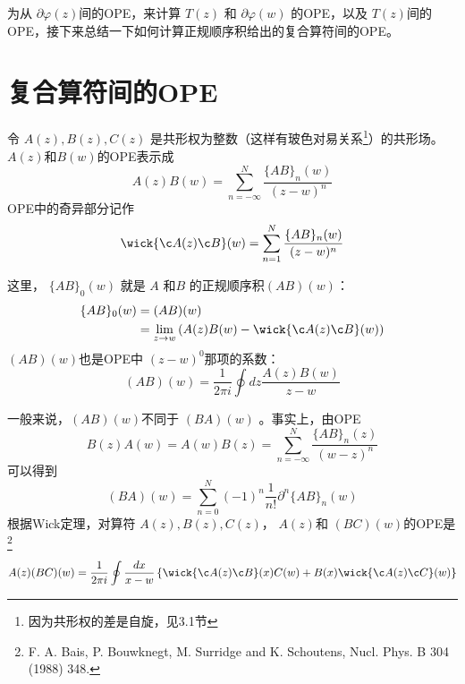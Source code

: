为从 $\partial \varphi(z) $间的OPE，来计算 $T(z)$ 和 $\partial \varphi(w)$ 的OPE，以及 $T(z) $间的OPE，接下来总结一下如何计算正规顺序积给出的复合算符间的OPE。

\section{复合算符间的OPE}
令 $A(z),B(z),C(z)$ 是共形权为整数（这样有玻色对易关系\footnote{因为共形权的差是自旋，见3.1节}）的共形场。 $A(z) 和 B(w) $的OPE表示成
\begin{equation}
	A(z) B(w)=\sum_{n=-\infty}^{N} \frac{\{A B\}_{n}(w)}{(z-w)^{n}}
\end{equation}
OPE中的奇异部分记作
\begin{equation}
	\wick{\c A(z) \c B}(w)=\sum_{n=1}^{N} \frac{\{A B\}_{n}(w)}{(z-w)^{n}}
\end{equation}

这里， $\{AB\}_0(w)$ 就是 $A$ 和$ B$ 的正规顺序积$ (AB)(w) $：
\begin{equation}
	\begin{aligned} \{A B\}_{0}(w) &=(A B)(w) \\ &=\lim _{z \rightarrow w}\left(A(z) B(w)-	\wick{\c A(z) \c B}(w)\right) \end{aligned}
\end{equation}
$(AB)(w) $也是OPE中 $(z-w)^0$那项的系数：
\begin{equation}
	(A B)(w)=\frac{1}{2 \pi i} \oint d z \frac{A(z) B(w)}{z-w}
\end{equation}


一般来说，$ (AB)(w) $不同于 $(BA)(w)$ 。事实上，由OPE
\begin{equation}
	B(z) A(w)=A(w) B(z)=\sum_{n=-\infty}^{N} \frac{\{A B\}_{n}(z)}{(w-z)^{n}}
\end{equation}
可以得到
\begin{equation}
	(B A)(w)=\sum_{n=0}^{N}(-1)^{n} \frac{1}{n !} \partial^{n}\{A B\}_{n}(w)
\end{equation}
根据Wick定理，对算符 $A(z),B(z),C(z) $， $A(z) $和 $(BC)(w) $的OPE是\footnote{F. A. Bais, P. Bouwknegt, M. Surridge and K. Schoutens, Nucl. Phys. B 304 (1988) 348.}
\begin{equation}
	A(z)(B C)(w)=\frac{1}{2 \pi i} \oint \frac{d x}{x-w}\left\{ \wick{\c A(z) \c B}(x) C(w)+B(x) \wick{\c A(z) \c C}(w)\right\}
\end{equation}

